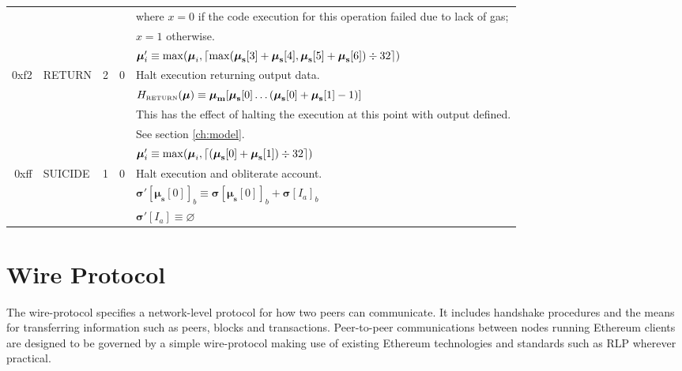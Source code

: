 \documentclass[9pt,oneside]{amsart}
\DeclarePairedDelimiter{\ceil}{\lceil}{\rceil}
\begin{document}
\begin{tabular*}{\columnwidth}[h]{rlrrl}
&&&& where $x=0$ if the code execution for this operation failed due to lack of gas;\\
&&&& $x=1$ otherwise. \\
&&&& $\boldsymbol{\mu}'_i \equiv \max(\boldsymbol{\mu}_i, \ceil{ \max(\boldsymbol{\mu}_\mathbf{s}[3] + \boldsymbol{\mu}_\mathbf{s}[4], \boldsymbol{\mu}_\mathbf{s}[5] + \boldsymbol{\mu}_\mathbf{s}[6]) \div 32 })$ \\
\midrule
0xf2 & {\small RETURN} & 2 & 0 & Halt execution returning output data. \\
&&&& $H_{\text{\tiny RETURN}}(\boldsymbol{\mu}) \equiv \boldsymbol{\mu}_\mathbf{m}[ \boldsymbol{\mu}_\mathbf{s}[0] \dots ( \boldsymbol{\mu}_\mathbf{s}[0] + \boldsymbol{\mu}_\mathbf{s}[1] - 1 ) ]$ \\
&&&& This has the effect of halting the execution at this point with output defined.\\
&&&& See section \ref{ch:model}. \\
&&&& $\boldsymbol{\mu}'_i \equiv \max(\boldsymbol{\mu}_i, \ceil{ (\boldsymbol{\mu}_\mathbf{s}[0] + \boldsymbol{\mu}_\mathbf{s}[1]) \div 32 })$ \\
\midrule
0xff & {\small SUICIDE} & 1 & 0 & Halt execution and obliterate account. \\
&&&& $\boldsymbol{\sigma}'[\boldsymbol{\mu}_\mathbf{s}[0]]_b \equiv \boldsymbol{\sigma}[\boldsymbol{\mu}_\mathbf{s}[0]]_b + \boldsymbol{\sigma}[I_a]_b$ \\
&&&& $\boldsymbol{\sigma}'[I_a] \equiv \varnothing$ \\
\bottomrule
\end{tabular*}


\section{Wire Protocol}\label{app:wire}
The wire-protocol specifies a network-level protocol for how two peers can communicate. It includes handshake procedures and the means for transferring information such as peers, blocks and transactions. Peer-to-peer communications between nodes running Ethereum clients are designed to be governed by a simple wire-protocol making use of existing Ethereum technologies and standards such as RLP wherever practical.
\end{document}
